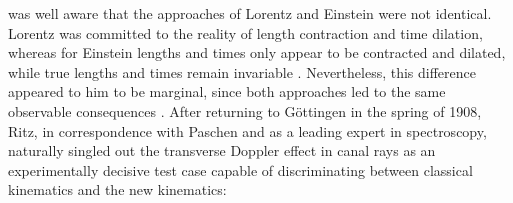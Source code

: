 \documentclass[pdflatex]{sn-jnl}
\begin{document}
\citet[203]{Ritz1908} was well aware that the approaches of Lorentz and Einstein were not identical. Lorentz was committed to the reality  of length contraction and time dilation, whereas for Einstein lengths and times only appear  to be contracted and dilated, while true lengths and times remain invariable \citep[203]{Ritz1908}. Nevertheless, this difference appeared to him to be marginal, since both approaches led to the same observable consequences \citep[213]{Ritz1908b}. After returning to Göttingen in the spring of 1908, Ritz, in correspondence with Paschen and as a leading expert in spectroscopy, naturally singled out the transverse Doppler effect in canal rays as an experimentally decisive test case capable of discriminating between classical kinematics and the new kinematics:
\end{document}
